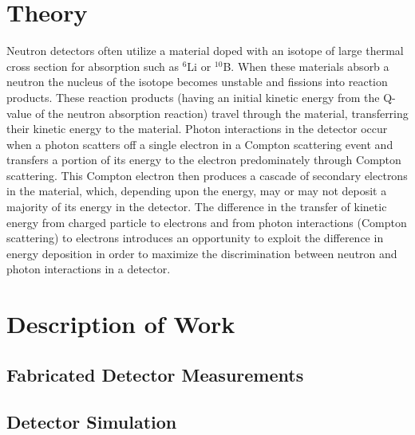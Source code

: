 \documentclass{anstrans}
\newcommand{\iso}[2]{${}^{#2}${#1}}
\begin{document}
\section{Theory}
Neutron detectors often utilize a material doped with an isotope of large thermal cross section for absorption such as \iso{Li}{6} or \iso{B}{10}. 
When these materials absorb a neutron the nucleus of the isotope becomes unstable and fissions into reaction products.
These reaction products (having an initial kinetic energy from the Q-value of the neutron absorption reaction) travel through the material, transferring their kinetic energy to the material.
Photon interactions in the detector occur when a photon scatters off a single electron in a Compton scattering event and transfers a portion of its energy to the electron predominately through Compton scattering.
This Compton electron then produces a cascade of secondary electrons in the material, which, depending upon the energy, may or may not deposit a majority of its energy in the detector.
The difference in the transfer of kinetic energy from charged particle to electrons and from photon interactions (Compton scattering) to electrons introduces an opportunity to exploit the difference in energy deposition in order to maximize the discrimination between neutron and photon interactions in a detector.

\section{Description of Work}

\subsection{Fabricated Detector Measurements}

\subsection{Detector Simulation}

\end{document}

